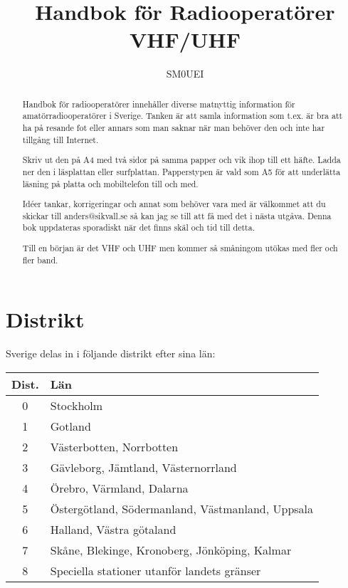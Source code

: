 \documentclass[10pt,swedish,a4paper]{article}
\begin{document}
\title{Handbok för Radiooperatörer\\
VHF/UHF}
\author{SM0UEI}
\maketitle

\begin{abstract}
Handbok för radiooperatörer innehåller diverse matnyttig information för amatörradiooperatörer i Sverige. Tanken är att samla information som t.ex. är bra att ha på resande fot eller annars som man saknar när man behöver den och inte har tillgång till Internet.

Skriv ut den på A4 med två sidor på samma papper och vik ihop till ett häfte. Ladda ner den i läsplattan eller surfplattan. Papperstypen är vald som A5 för att underlätta läsning på platta och mobiltelefon till och med.

Idéer tankar, korrigeringar och annat som behöver vara med är välkommet att du skickar till anders@sikvall.se så kan jag se till att få med det i nästa utgåva. Denna bok uppdateras sporadiskt när det finns skäl och tid till detta.

Till en början är det VHF och UHF men kommer så småningom utökas med fler och fler band.
\end{abstract}

\clearpage
\tableofcontents
\clearpage

\setlength{\parskip}{0.5em}
\setlength{\parindent}{0pt}


\section{Distrikt}

Sverige delas in i följande distrikt efter sina län:

\begin{tabular}{cl}
	\textbf{Dist.} & \textbf{Län}                                     \\ \hline
	      0        & Stockholm                                        \\
	      1        & Gotland                                          \\
	      2        & Västerbotten, Norrbotten                         \\
	      3        & Gävleborg, Jämtland, Västernorrland              \\
	      4        & Örebro, Värmland, Dalarna                        \\
	      5        & Östergötland, Södermanland, Västmanland, Uppsala \\
	      6        & Halland, Västra götaland                         \\
	      7        & Skåne, Blekinge, Kronoberg, Jönköping, Kalmar    \\
	      8        & Speciella stationer utanför landets gränser
\end{tabular}
\end{document}
